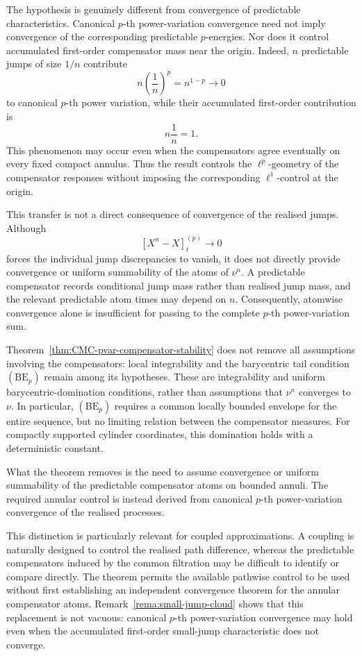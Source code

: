 \documentclass[a4paper,10pt]{article}
\begin{document}
The hypothesis is genuinely different from convergence of predictable
characteristics. Canonical \(p\)-th power-variation convergence need
not imply convergence of the corresponding predictable
\(p\)-energies. Nor does it control accumulated first-order
compensator mass near the origin. Indeed, \(n\) predictable jumps of
size \(1/n\) contribute
\[
        n\left(\frac1n\right)^p
        =
        n^{1-p}
        \longrightarrow0
\]
to canonical \(p\)-th power variation, while their accumulated
first-order contribution is
\[
        n\frac1n=1.
\]
This phenomenon may occur even when the compensators agree eventually
on every fixed compact annulus. Thus the result controls the
\(\ell^p\)-geometry of the compensator responses without imposing the
corresponding \(\ell^1\)-control at the origin.

This transfer is not a direct consequence of convergence of the
realised jumps. Although
\[
        [X^n-X]^{(p)}_t\longrightarrow0
\]
forces the individual jump discrepancies to vanish, it does not
directly provide convergence or uniform summability of the atoms of
\(\nu^n\). A predictable compensator records conditional jump mass
rather than realised jump mass, and the relevant predictable atom
times may depend on \(n\). Consequently, atomwise convergence alone is
insufficient for passing to the complete \(p\)-th power-variation sum.

Theorem~\ref{thm:CMC-pvar-compensator-stability} does not remove all
assumptions involving the compensators: local integrability and the
barycentric tail condition \((\mathrm{BE}_p)\) remain among its
hypotheses. These are integrability and uniform
barycentric-domination conditions, rather than assumptions that
\(\nu^n\) converges to \(\nu\). In particular,
\((\mathrm{BE}_p)\) requires a common locally bounded envelope for the
entire sequence, but no limiting relation between the compensator
measures. For compactly supported cylinder coordinates, this
domination holds with a deterministic constant.

What the theorem removes is the need to assume convergence or uniform
summability of the predictable compensator atoms on bounded annuli. The required
annular control is instead derived from canonical \(p\)-th
power-variation convergence of the realised processes.

This distinction is particularly relevant for coupled approximations.
A coupling is naturally designed to control the realised path
difference, whereas the predictable compensators induced by the
common filtration may be difficult to identify or compare directly.
The theorem permits the available pathwise control to be used without
first establishing an independent convergence theorem for the
annular compensator atoms. Remark~\ref{rema:small-jump-cloud} shows
that this replacement is not vacuous: canonical \(p\)-th
power-variation convergence may hold even when the accumulated
first-order small-jump characteristic does not converge.
\end{document}
